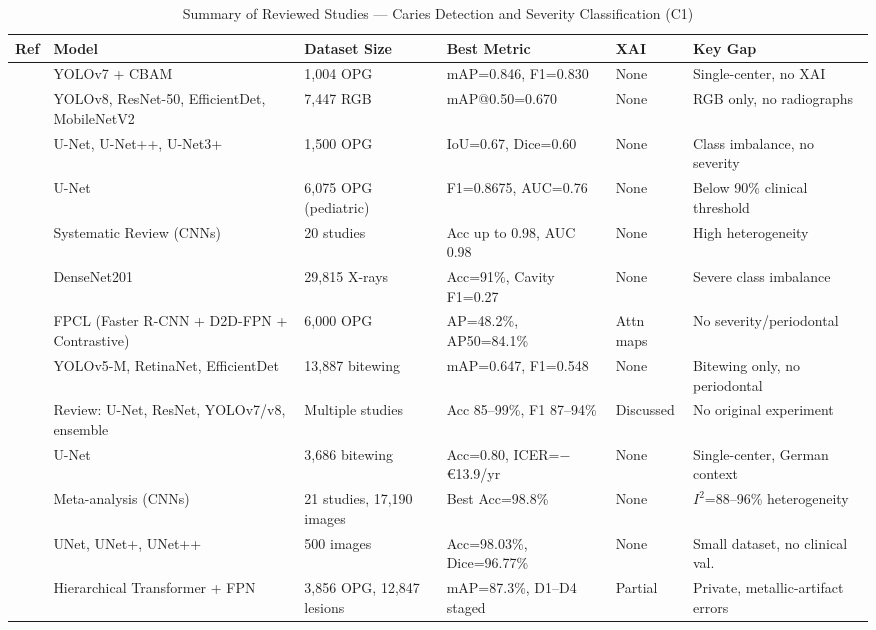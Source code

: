 \documentclass[conference]{IEEEtran}
\begin{document}
\begin{table}[t]
\caption{Summary of Reviewed Studies --- Caries Detection and Severity Classification (C1)}
\label{tab:c1}
\centering
\small
\begin{tabular}{p{0.6cm} p{4.8cm} p{3.0cm} p{3.5cm} p{1.0cm} p{3.2cm}}
\toprule
\textbf{Ref} & \textbf{Model} & \textbf{Dataset Size} & \textbf{Best Metric} & \textbf{XAI} & \textbf{Key Gap} \\
\midrule
\cite{ayhan2025detection}   & YOLOv7 + CBAM & 1,004 OPG & mAP=0.846, F1=0.830 & None & Single-center, no XAI \\
\cite{khuwaja2024ai}        & YOLOv8, ResNet-50, EfficientDet, MobileNetV2 & 7,447 RGB & mAP@0.50=0.670 & None & RGB only, no radiographs \\
\cite{alharbi2023detection} & U-Net, U-Net++, U-Net3+ & 1,500 OPG & IoU=0.67, Dice=0.60 & None & Class imbalance, no severity \\
\cite{asci2024deep}         & U-Net & 6,075 OPG (pediatric) & F1=0.8675, AUC=0.76 & None & Below 90\% clinical threshold \\
\cite{albano2024artificial} & Systematic Review (CNNs) & 20 studies & Acc up to 0.98, AUC 0.98 & None & High heterogeneity \\
\cite{kaushik2025densenet201} & DenseNet201 & 29,815 X-rays & Acc=91\%, Cavity F1=0.27 & None & Severe class imbalance \\
\cite{chen2024cariesxrays}  & FPCL (Faster R-CNN + D2D-FPN + Contrastive) & 6,000 OPG & AP=48.2\%, AP50=84.1\% & Attn maps & No severity/periodontal \\
\cite{perez2024ai}          & YOLOv5-M, RetinaNet, EfficientDet & 13,887 bitewing & mAP=0.647, F1=0.548 & None & Bitewing only, no periodontal \\
\cite{sastika2025ai}        & Review: U-Net, ResNet, YOLOv7/v8, ensemble & Multiple studies & Acc 85--99\%, F1 87--94\% & Discussed & No original experiment \\
\cite{schwendicke2021cost}  & U-Net & 3,686 bitewing & Acc=0.80, ICER=$-$\euro13.9/yr & None & Single-center, German context \\
\cite{luke2025accuracy}     & Meta-analysis (CNNs) & 21 studies, 17,190 images & Best Acc=98.8\% & None & $I^2$=88--96\% heterogeneity \\
\cite{vickram2025extraction}& UNet, UNet+, UNet++ & 500 images & Acc=98.03\%, Dice=96.77\% & None & Small dataset, no clinical val. \\
\cite{wang2026transformer}  & Hierarchical Transformer + FPN & 3,856 OPG, 12,847 lesions & mAP=87.3\%, D1--D4 staged & Partial & Private, metallic-artifact errors \\

\end{tabular}
\end{table}
\end{document}
